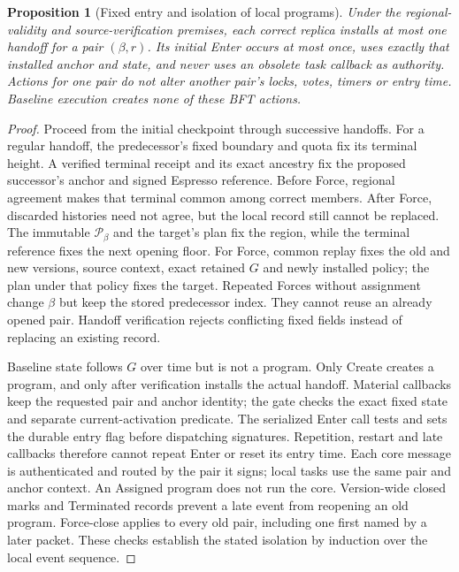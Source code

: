 \documentclass[11pt,a4paper]{article}
\newtheorem{proposition}[proposition]{Proposition}
\begin{document}
\begin{proposition}[Fixed entry and isolation of local programs]
\label{prop:program-isolation}
Under the regional-validity and source-verification premises, each
correct replica installs at most one handoff for a pair $(\beta,r)$.
Its initial Enter occurs at most once, uses exactly that installed
anchor and state, and never uses an obsolete task callback as authority.
Actions for one pair do not alter another pair's locks,
votes, timers or entry time. Baseline execution creates none of
these BFT actions.
\end{proposition}
\begin{proof}
Proceed from the initial checkpoint through successive handoffs.
For a regular handoff, the predecessor's fixed boundary and quota fix
its terminal height. A verified terminal receipt and its exact ancestry
fix the proposed successor's anchor and signed Espresso reference.
Before Force, regional agreement makes that terminal common among
correct members. After Force, discarded histories need not agree, but
the local record still cannot be replaced. The immutable
$\mathcal P_\beta$ and the target's plan
fix the region, while the terminal reference fixes the next opening
floor. For Force, common replay fixes the old and new versions, source
context, exact retained $G$ and newly installed policy; the plan under
that policy fixes the target. Repeated Forces without assignment
change $\beta$ but keep the stored predecessor index. They cannot
reuse an already opened pair. Handoff verification rejects conflicting
fixed fields instead of replacing an existing record.

Baseline state follows $G$ over time but is not a program. Only Create
creates a program, and only after verification installs the actual
handoff.
Material callbacks keep the requested pair and anchor identity;
the gate checks the exact fixed state and separate current-activation predicate.
The serialized Enter call tests and sets the durable entry flag
before dispatching signatures. Repetition, restart and late callbacks
therefore cannot repeat Enter or reset its entry time. Each core
message is authenticated and routed by the pair it signs; local tasks
use the same pair and anchor context. An Assigned program does not run
the core.
Version-wide closed marks and Terminated records prevent a late event
from reopening an old program. Force-close applies to every old pair,
including one first named by a later packet. These checks establish
the stated isolation by induction
over the local event sequence.
\end{proof}
\end{document}
